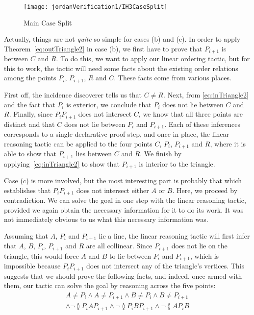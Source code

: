 \begin{figure}
\centering\texttt{[image: jordanVerification1/IH3CaseSplit]}
\caption{Main Case Split}
\label{fig:IH3CaseSplit}
\end{figure}

Actually, things are not \emph{quite} so simple for cases (b) and (c). In order to apply Theorem~\ref{eq:outTriangle2} in case (b), we first have to prove that $P_{i+1}$ is between $C$ and $R$. To do this, we want to apply our linear ordering tactic, but for this to work, the tactic will need some facts about the existing order relations among the points $P_i$, $P_{i+1}$, $R$ and $C$. These facts come from various places.

First off, the incidence discoverer tells us that $C \neq R$. Next, from \eqref{eq:inTriangle2} and the fact that $P_i$ is exterior, we conclude that $P_i$ does not lie between $C$ and $R$. Finally, since $P_iP_{i+1}$ does not intersect $C$, we know that all three points are distinct and that $C$ does not lie between $P_i$ and $P_{i+1}$. Each of these inferences corresponds to a single declarative proof step, and once in place, the linear reasoning tactic can be applied to the four points $C$, $P_i$, $P_{i+1}$ and $R$, where it is able to show that $P_{i+1}$ lies between $C$ and $R$. We finish by applying~\eqref{eq:inTriangle2} to show that $P_{i+1}$ is interior to the triangle.

Case (c) is more involved, but the most interesting part is probably that which establishes that $P_iP_{i+1}$ does not intersect either $A$ or $B$. Here, we proceed by contradiction. We can solve the goal in one step with the linear reasoning tactic, provided we again obtain the necessary information for it to do its work. It was not immediately obvious to us what this necessary information was.

Assuming that $A$, $P_i$ and $P_{i+1}$ lie a line, the linear reasoning tactic will first infer that $A$, $B$, $P_i$, $P_{i+1}$ and $R$ are all collinear. Since $P_{i+1}$ does not lie on the triangle, this would force $A$ and $B$ to lie between $P_i$ and $P_{i+1}$, which is impossible because $P_iP_{i+1}$ does not intersect any of the triangle's vertices. This suggests that we should prove the following facts, and indeed, once armed with them, our tactic can solve the goal by reasoning across the five points:
\begin{multline}
A \neq P_i \wedge A \neq P_{i+1} \wedge B \neq P_i \wedge B \neq P_{i+1}\\ \wedge \neg\between{P_i}{A}{P_{i+1}} \wedge \neg\between{P_i}{B}{P_{i+1}} \wedge \neg\between{A}{P_i}{B}
\end{multline}

